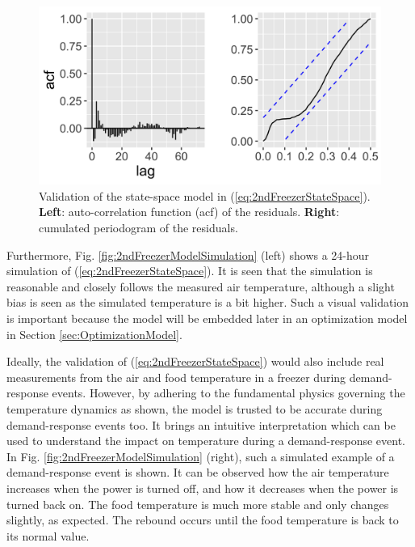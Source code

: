 \begin{figure}[!t]
    \centering
    \includegraphics[width=\columnwidth]{../figures/2ndFreezerModelValidation.png}
    \caption{ Validation of the state-space model in (\ref{eq:2ndFreezerStateSpace}). \textbf{Left}: auto-correlation function (acf) of the  residuals. \textbf{Right}: cumulated periodogram of the residuals.}
    \label{fig:2ndFreezerModelValidation}
\end{figure}



Furthermore, Fig. \ref{fig:2ndFreezerModelSimulation} (left) shows a 24-hour simulation of  (\ref{eq:2ndFreezerStateSpace}). It is seen that the simulation is  reasonable and closely follows the measured air temperature, although a slight bias is seen as the simulated temperature is a bit higher. Such a visual validation is important because the model will be embedded later in an optimization model in Section \ref{sec:OptimizationModel}.

Ideally, the validation of (\ref{eq:2ndFreezerStateSpace}) would also include real measurements from the air and food temperature in a freezer during demand-response events. However, by adhering to the fundamental physics governing the temperature dynamics as shown, the model is trusted to be accurate during demand-response events too. It brings an intuitive interpretation which can be used to understand the impact on temperature during a demand-response event.
In Fig. \ref{fig:2ndFreezerModelSimulation} (right), such a simulated example of a demand-response event is shown. It can be observed how the air temperature increases when the power is turned off, and how it decreases when the power is turned back on. The food temperature is much more stable and only changes slightly, as expected. The rebound occurs until the food temperature is back to its normal value.

